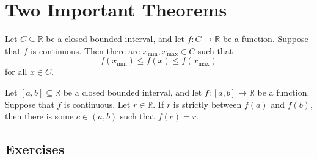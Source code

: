 \section{Two Important Theorems}
\begin{theorem}
	\label{theorem-3.5.1}
	Let $C \subseteq \mathbb{R}$ be a closed bounded interval, and let $f:C\to\mathbb{R}$ be a function. Suppose that $f$ is continuous. Then there are $x_{\text{min}},x_{\text{max}}\in C$ such that
	\begin{equation*}
	f\left(x_{\text{min}}\right) \leq f\left(x\right)\leq f\left(x_{\text{max}}\right)
	\end{equation*}
	for all $x \in C$.
\end{theorem}

\begin{theorem}
	\label{theorem-3.5.2}
	Let $\left[ a, b \right] \subseteq \mathbb{R}$ be a closed bounded interval, and let $f:\left[ a, b \right]\to\mathbb{R}$ be a function. Suppose that $f$ is continuous. Let $r \in \mathbb{R}$. If $r$ is strictly between $f\left(a\right)$ and $f\left(b\right)$, then there is some $c \in \left( a, b \right)$ such that $f\left(c\right) = r$.
\end{theorem}

\subsection{Exercises}
\setcounter{exercise}{3}

